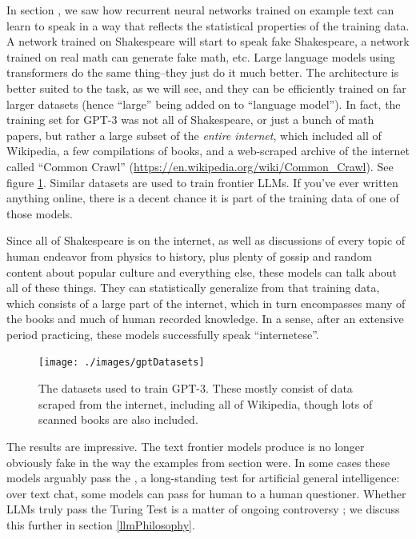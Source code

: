 In section , we saw how recurrent neural
networks trained on example text can learn to speak in a way that reflects the
statistical properties of the training data. A network trained on Shakespeare
will start to speak fake Shakespeare, a network trained on real math can
generate fake math, etc. Large language models using transformers do the same
thing--they just do it much better. The architecture is better suited to the
task, as we will see, and they can be efficiently trained on far larger
datasets (hence ``large'' being added on to ``language model''). In fact, the
training set for GPT-3 was not all of Shakespeare, or just a bunch of math
papers, but rather a large subset of the \emph{entire internet}, which included
all of Wikipedia, a few compilations of books, and a web-scraped archive of the
internet called ``Common Crawl''
(\url{https://en.wikipedia.org/wiki/Common_Crawl}). See figure
\ref{gptDatasets}. Similar datasets are used to train frontier LLMs. If you've
ever written anything online, there is a decent chance it is part of the
training data of one of those models.

Since all of Shakespeare is on the internet, as well as discussions of every
topic of human endeavor from physics to history, plus plenty of gossip and
random content about popular culture and everything else, these models can talk
about all of these things. They can statistically generalize from that training
data, which consists of a large part of the internet, which in turn encompasses
many of the books and much of human recorded knowledge. In a sense, after an
extensive period practicing, these models successfully speak ``internetese''.

\begin{figure}[ht]
\centering
\texttt{[image: ./images/gptDatasets]}
\caption[From \cite{brown2020language}.]{The datasets used to train GPT-3.
These mostly consist of data scraped from the internet, including all of
Wikipedia, though lots of scanned books are also included.}
\label{gptDatasets}
\end{figure}

The results are impressive. The text frontier models produce is no longer
obviously fake in the way the examples from section
 were. In some cases these models arguably pass
the , a long-standing test for artificial general
intelligence: over text chat, some models can pass for human to a human
questioner. Whether LLMs truly pass the Turing Test is a matter of ongoing
controversy \cite{jones2024does}; we discuss this further in section \ref{llmPhilosophy}.

